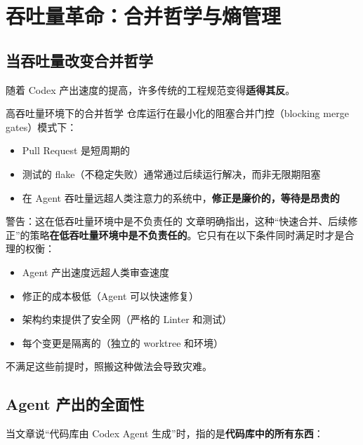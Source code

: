 \section{吞吐量革命：合并哲学与熵管理}

\subsection{当吞吐量改变合并哲学}

随着 Codex 产出速度的提高，许多传统的工程规范变得\textbf{适得其反}。

\begin{importantbox}{高吞吐量环境下的合并哲学}
仓库运行在最小化的阻塞合并门控（blocking merge gates）模式下：
\begin{itemize}[nosep]
  \item Pull Request 是短周期的
  \item 测试的 flake（不稳定失败）通常通过后续运行解决，而非无限期阻塞
  \item 在 Agent 吞吐量远超人类注意力的系统中，\textbf{修正是廉价的，等待是昂贵的}
\end{itemize}
\end{importantbox}

\begin{warningbox}{警告：这在低吞吐量环境中是不负责任的}
文章明确指出，这种``快速合并、后续修正''的策略\textbf{在低吞吐量环境中是不负责任的}。它只有在以下条件同时满足时才是合理的权衡：
\begin{itemize}[nosep]
  \item Agent 产出速度远超人类审查速度
  \item 修正的成本极低（Agent 可以快速修复）
  \item 架构约束提供了安全网（严格的 Linter 和测试）
  \item 每个变更是隔离的（独立的 worktree 和环境）
\end{itemize}
不满足这些前提时，照搬这种做法会导致灾难。
\end{warningbox}

\subsection{Agent 产出的全面性}

当文章说``代码库由 Codex Agent 生成''时，指的是\textbf{代码库中的所有东西}：

